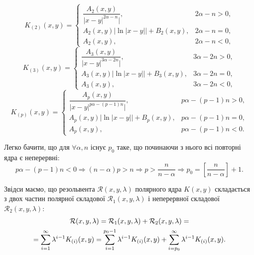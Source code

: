 \begin{equation}
	\label{eq:1.25}
	K_{(2)}(x, y) = \begin{cases}
		\dfrac{A_2(x, y)}{|x - y|^{2\alpha - n}|}, & 2\alpha - n > 0, \\
		A_2(x, y) |\ln|x - y|| + B_2(x, y), & 2\alpha - n = 0, \\
		A_2(x, y), & 2\alpha - n < 0,
	\end{cases}
\end{equation}
\begin{equation}
	\label{eq:1.26}
	K_{(3)}(x, y) = \begin{cases}
		\dfrac{A_3(x, y)}{|x - y|^{3\alpha - 2n}|}, & 3\alpha - 2n > 0, \\
		A_3(x, y) |\ln|x - y|| + B_3(x, y), & 3\alpha - 2n = 0, \\
		A_3(x, y), & 3\alpha - 2n < 0,
	\end{cases}
\end{equation}
\begin{equation}
	\label{eq:1.27}
	K_{(p)}(x, y) = \begin{cases}
		\dfrac{A_p(x, y)}{|x - y|^{p\alpha - (p-1)n}|}, & p\alpha - (p - 1)n > 0, \\
		A_p(x, y) |\ln|x - y|| + B_p(x, y), & p\alpha - (p - 1)n = 0, \\
		A_p(x, y), & p\alpha - (p - 1)n < 0.
	\end{cases}
\end{equation}

Легко бачити, що для $\forall \alpha, n$ існує $p_0$ таке, що починаючи з нього всі повторні ядра є неперервні:
\begin{equation}
	\label{eq:1.28}
	p \alpha - (p - 1) n < 0 \Rightarrow (n - \alpha) p > n \Rightarrow p > \dfrac{n}{n - \alpha} \Rightarrow p_0 = \left[ \dfrac{n}{n - \alpha} \right] + 1.
\end{equation}

Звідси маємо, що резольвента $\mathcal{R}(x, y, \lambda)$ полярного ядра $K(x, y)$ складається з двох частин полярної складової $\mathcal{R}_1(x, y, \lambda)$ і неперервної складової $\mathcal{R}_2(x, y, \lambda)$:
\begin{multline}
	\label{eq:1.29}
	\mathcal{R}(x, y, \lambda) = \mathcal{R}_1(x, y, \lambda) + \mathcal{R}_2(x, y, \lambda) = \\
	= \displaystyle\sum\limits_{i = 1}^\infty \lambda^{i - 1} K_{(i)}(x, y) = \displaystyle\sum\limits_{i = 1}^{p_0 - 1} \lambda^{i - 1} K_{(i)}(x, y) + \displaystyle\sum\limits_{i = p_0}^\infty \lambda^{i - 1} K_{(i)}(x, y).
\end{multline}

